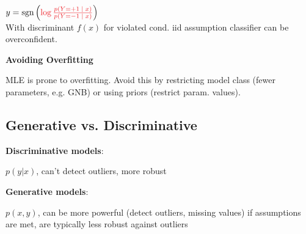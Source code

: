 \qquad \qquad $y = \sgn \left( \color{Red} \log \frac{p(Y = +1 \; | \; x)}{p(Y = -1 \; | \; x)} \color{Black} \right)$ \\[-3pt]

With discriminant \color{Red}$f(x)$\color{Black} for violated cond. iid assumption classifier can be overconfident.

\textbf{Avoiding Overfitting}

MLE is prone to overfitting. Avoid this by restricting model class (fewer parameters, e.g. GNB) or using priors (restrict param. values).

\subsection*{Generative vs. Discriminative}

\textbf{Discriminative models}:

$p(y | x)$, can't detect outliers, more robust

\textbf{Generative models}:

$p(x,y)$, can be more powerful (detect outliers, missing values) if assumptions are met, are typically less robust against outliers
